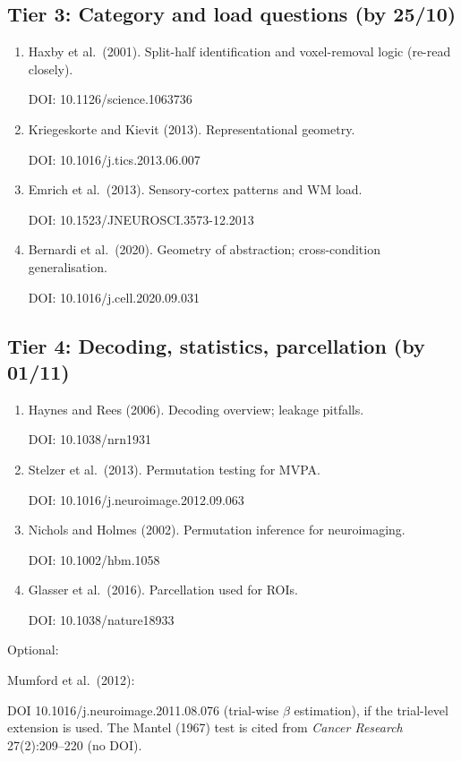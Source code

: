 \documentclass[11pt,a4paper]{article}
\begin{document}
\subsection*{Tier 3: Category and load questions (by 25/10)}
\begin{enumerate}[label=\arabic*.,resume]
\item Haxby et al.\ (2001). Split-half identification and voxel-removal logic (re-read closely). 

DOI: 10.1126/science.1063736
\item Kriegeskorte and Kievit (2013). Representational geometry. 

DOI: 10.1016/j.tics.2013.06.007
\item Emrich et al.\ (2013). Sensory-cortex patterns and WM load. 

DOI: 10.1523/JNEUROSCI.3573-12.2013
\item Bernardi et al.\ (2020). Geometry of abstraction; cross-condition generalisation. 

DOI: 10.1016/j.cell.2020.09.031
\end{enumerate}

\subsection*{Tier 4: Decoding, statistics, parcellation (by 01/11)}
\begin{enumerate}[label=\arabic*.,resume]
\item Haynes and Rees (2006). Decoding overview; leakage pitfalls. 

DOI: 10.1038/nrn1931
\item Stelzer et al.\ (2013). Permutation testing for MVPA. 

DOI: 10.1016/j.neuroimage.2012.09.063
\item Nichols and Holmes (2002). Permutation inference for neuroimaging. 

DOI: 10.1002/hbm.1058
\item Glasser et al.\ (2016). Parcellation used for ROIs. 

DOI: 10.1038/nature18933
\end{enumerate}

Optional: 

Mumford et al.\ (2012):

DOI 10.1016/j.neuroimage.2011.08.076 (trial-wise $\beta$ estimation), if the trial-level extension is used. The Mantel (1967) test is cited from \emph{Cancer Research} 27(2):209--220 (no DOI).
\end{document}
